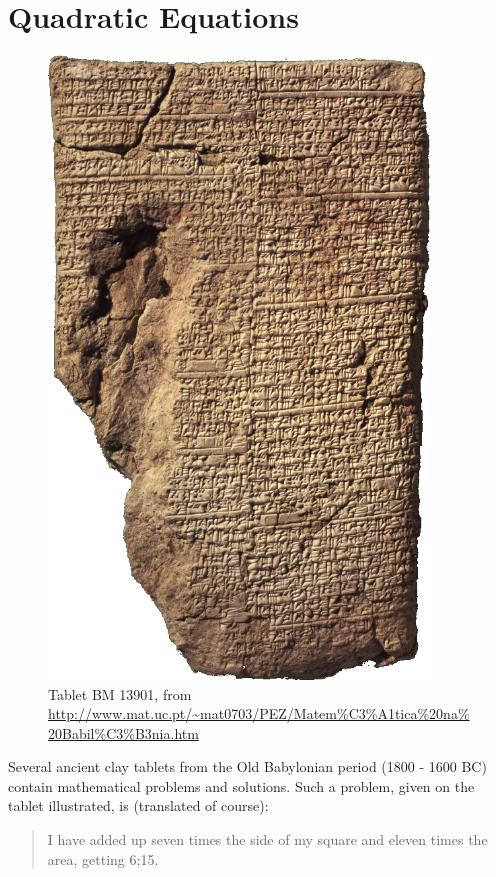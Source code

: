 \documentclass[a4paper,10pt,titlepage]{article}
\theoremstyle{definition}
\begin{document}
\section{Quadratic Equations}
\begin{figure}[p]
  \includegraphics[width=0.9\textwidth]{babylon}
  \captionsetup{labelformat=empty}
  \caption{Tablet BM 13901, from \url{http://www.mat.uc.pt/~mat0703/PEZ/Matem\%C3\%A1tica\%20na\%20Babil\%C3\%B3nia.htm}}
\end{figure}
Several ancient clay tablets from the Old Babylonian period (1800 - 1600 BC)
contain mathematical problems and solutions. Such a problem, given on the tablet
illustrated, is (translated of course):

\begin{quote}
  I have added up seven times the side of my square and eleven times the area,
  getting 6;15.
\end{quote}
\end{document}
